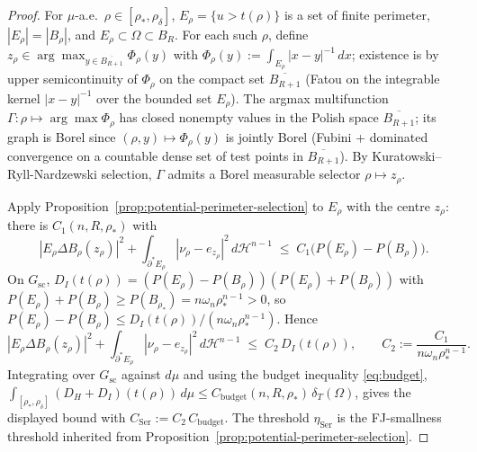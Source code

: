 \documentclass[11pt]{amsart}
\theoremstyle{definition}
\newcommand{\Om}{\Omega}
\newcommand{\dT}{\delta_T}
\newcommand{\rstar}{\rho_*}
\newcommand{\rdel}{\rho_\delta}
\newcommand{\Hn}{\mathcal H^{n-1}}
\newcommand{\Per}{P}
\begin{document}
\begin{proof}
For \(\mu\)-a.e.\ \(\rho\in[\rstar,\rdel]\), \(E_\rho=\{u>t(\rho)\}\) is a set
of finite perimeter, \(|E_\rho|=|B_\rho|\), and \(E_\rho\subset\Om\subset B_R\).
For each such \(\rho\), define
\(z_\rho\in\arg\max_{y\in\overline{B_{R+1}}}\Phi_\rho(y)\) with
\(\Phi_\rho(y):=\int_{E_\rho}|x-y|^{-1}\,dx\); existence is by upper
semicontinuity of \(\Phi_\rho\) on the compact set \(\overline{B_{R+1}}\)
(Fatou on the integrable kernel \(|x-y|^{-1}\) over the bounded set
\(E_\rho\)).  The argmax multifunction \(\Gamma:\rho\mapsto\arg\max\Phi_\rho\)
has closed nonempty values in the Polish space \(\overline{B_{R+1}}\); its
graph is Borel since \((\rho,y)\mapsto\Phi_\rho(y)\) is jointly Borel (Fubini
+ dominated convergence on a countable dense set of test points in
\(\overline{B_{R+1}}\)).  By Kuratowski--Ryll-Nardzewski selection,
\(\Gamma\) admits a Borel measurable selector \(\rho\mapsto z_\rho\).

Apply Proposition~\ref{prop:potential-perimeter-selection} to \(E_\rho\) with
the centre \(z_\rho\): there is \(C_1(n,R,\rstar)\) with
\[
   |E_\rho\Delta B_\rho(z_\rho)|^2
   +\int_{\partial^*E_\rho}\!|\nu_\rho-e_{z_\rho}|^2\,d\Hn
   \;\le\;C_1\bigl(\Per(E_\rho)-\Per(B_\rho)\bigr).
\]
On \(G_{\mathrm{sc}}\),
\(D_I(t(\rho))=(\Per(E_\rho)-\Per(B_\rho))(\Per(E_\rho)+\Per(B_\rho))\) with
\(\Per(E_\rho)+\Per(B_\rho)\ge\Per(B_{\rstar})=n\omega_n\rstar^{n-1}>0\), so
\(\Per(E_\rho)-\Per(B_\rho)\le D_I(t(\rho))/(n\omega_n\rstar^{n-1})\).  Hence
\[
   |E_\rho\Delta B_\rho(z_\rho)|^2
   +\int_{\partial^*E_\rho}\!|\nu_\rho-e_{z_\rho}|^2\,d\Hn
   \;\le\;C_2\,D_I(t(\rho)),
   \qquad C_2:=\frac{C_1}{n\omega_n\rstar^{n-1}}.
\]
Integrating over \(G_{\mathrm{sc}}\) against \(d\mu\) and using the budget
inequality \eqref{eq:budget},
\(\int_{[\rstar,\rdel]}(D_H+D_I)(t(\rho))\,d\mu\le
C_{\mathrm{budget}}(n,R,\rstar)\,\dT(\Om)\), gives the displayed bound with
\(C_{\mathrm{Ser}}:=C_2\,C_{\mathrm{budget}}\).  The threshold
\(\eta_{\mathrm{Ser}}\) is the FJ-smallness threshold inherited from
Proposition~\ref{prop:potential-perimeter-selection}.
\end{proof}
\end{document}
